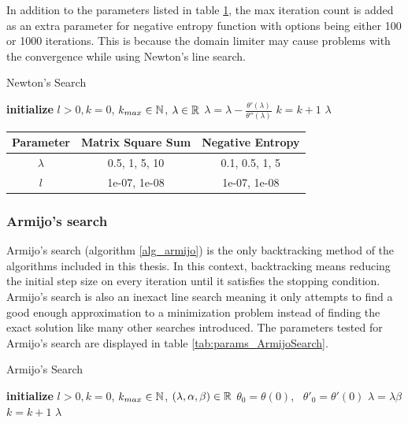 \documentclass[english, 12pt, a4paper, sci, utf8, a-1b, online, table]{aaltothesis}
\newcommand{\abs}[1]{\ensuremath|#1|}
\newcommand{\R}{\ensuremath\mathbb{R}}
\newcommand{\N}{\ensuremath\mathbb{N}}
\begin{document}
In addition to the parameters listed in table \ref{tab:params_NewtonsSearch}, the max iteration count is added as an extra parameter for negative entropy function with options being either 100 or 1000 iterations. This is because the domain limiter may cause problems with the convergence while using Newton's line search.

\begin{algorithm}[H]
\caption{Newton's Search}
\label{alg_newtons_search}
\begin{algorithmic}[1]
\STATE \textbf{initialize} $l > 0, k = 0$, $k_{max} \in \N$, $\lambda \in \R$
\WHILE{$\abs{\theta'(\lambda)} > l$ \AND $k < k_{max}$}
    \STATE $\lambda = \lambda -\frac{\theta'(\lambda)}{\theta''(\lambda)}$
    \STATE $k = k + 1$
\ENDWHILE
\RETURN $\lambda$
\end{algorithmic}
\end{algorithm}

\begin{table}[H]
\label{tab:params_NewtonsSearch}
\centering
{}
\begin{tabular}{|c|c|c|}
\hline
\rowcolor{gray!25}
Parameter & Matrix Square Sum & Negative Entropy \\
\hline
$\lambda$ & 0.5, 1, 5, 10 & 0.1, 0.5, 1, 5 \\
$l$ & 1e-07, 1e-08 & 1e-07, 1e-08 \\
\hline
\end{tabular}
\end{table}


\subsubsection{Armijo's search}


Armijo's search (algorithm \ref{alg_armijo}) is the only backtracking method of the algorithms included in this thesis. In this context, backtracking means reducing the initial step size on every iteration until it satisfies the stopping condition. Armijo's search is also an inexact line search meaning it only attempts to find a good enough approximation to a minimization problem instead of finding the exact solution like many other searches introduced. The parameters tested for Armijo's search are displayed in table \ref{tab:params_ArmijoSearch}. \cite{book:convex_optimization}


\begin{algorithm}[H]
\caption{Armijo's Search}
\label{alg_armijo}
\begin{algorithmic}[1]
\STATE \textbf{initialize} $l > 0, k = 0$, $k_{max} \in \N$, $(\lambda, \alpha, \beta) \in \R$
\STATE $\theta_0 = \theta(0)$, \ $\theta'_0 = \theta'(0)$
    \STATE $\lambda = \lambda \beta$
    \STATE $k = k + 1$
\ENDWHILE
\RETURN $\lambda$
\end{algorithmic}
\end{algorithm}
\end{document}
